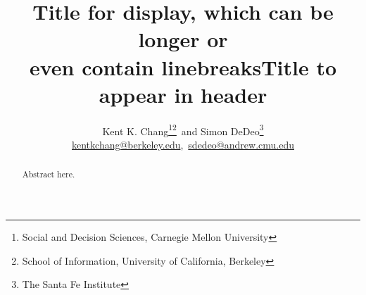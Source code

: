 \documentclass[14pt,twoside]{extarticle}
\begin{document}
\thispagestyle{empty}
\title{Title for display, which can be longer or\\even contain linebreaks}
\author{Kent K. Chang\footnote{\label{inst_a}Social and Decision Sciences, Carnegie Mellon University}\mfs\footnote{School of Information, University of California, Berkeley}~and Simon DeDeo\mfs\footnote{The Santa Fe Institute}\\{\footnotesize\url{kentkchang@berkeley.edu},\, \url{sdedeo@andrew.cmu.edu}}}
\maketitle

\title{Title to appear in header}
\makeatletter
\let\headertitle\@title
\makeatother

\begin{abstract}
Abstract here.
\end{abstract}

\let\footnote=\endnote

\bigskip
\theendnotes
\end{document}
